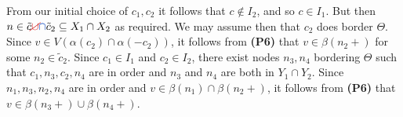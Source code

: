 From our initial choice of $c_1, c_2$ it follows that $c \notin I_2$, and so $c \in I_1$. But then $n \in \tilde{c} \delm{\cup}\fix{\cap} \tilde{c}_2 \subseteq X_1 \cap X_2$ as required. We may assume then that $c_2$ does border $\Theta$. Since $v \in V(\alpha(c_2) \cap \alpha(-c_2))$, it follows from \textbf{(P6)} that $v \in \beta(n_2 +)$ for some $n_2 \in \tilde{c}_2$. Since $c_1 \in I_1$ and $c_2 \in I_2$, there exist nodes $n_3, n_4$ bordering $\Theta$ such that $c_1, n_3, c_2, n_4$ are in order and $n_3$ and $n_4$ are both in $Y_1 \cap Y_2$. Since $n_1, n_3, n_2, n_4$ are in order and $v \in \beta(n_1) \cap \beta(n_2 +)$, it follows from \textbf{(P6)} that $v \in \beta(n_3 +) \cup \beta(n_4 +)$.
